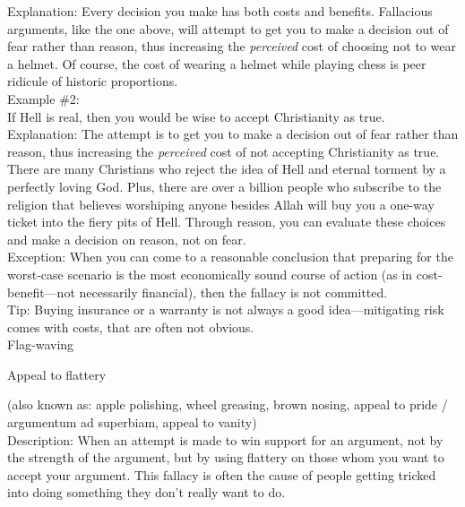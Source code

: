 \documentclass[a4paper,12pt,single,pdftex]{scrartcl}
\begin{document}
    
      Explanation: Every decision you make has both costs and benefits.  Fallacious arguments, like the one above, will attempt to get you to make a decision out of fear rather than reason, thus increasing the {\it perceived}  cost of choosing not to wear a helmet.  Of course, the cost of wearing a helmet while playing chess is peer ridicule of historic proportions.
    \\

    
      Example \#2:
    \\

    
      If Hell is real, then you would be wise to accept Christianity as true.
    \\

    
      Explanation: The attempt is to get you to make a decision out of fear rather than reason, thus increasing the {\it perceived} cost of not accepting Christianity as true.  There are many Christians who reject the idea of Hell and eternal torment by a perfectly loving God.  Plus, there are over a billion people who subscribe to the religion that believes worshiping anyone besides Allah will buy you a one-way ticket into the fiery pits of Hell.  Through reason, you can evaluate these choices and make a decision on reason, not on fear.
    \\

    
      Exception: When you can come to a reasonable conclusion that preparing for the worst-case scenario is the most economically sound course of action (as in cost-benefit—not necessarily financial), then the fallacy is not committed.
    \\

    
      Tip: Buying insurance or a warranty is not always a good idea—mitigating risk comes with costs, that are often not obvious.
    \\

  

Flag-waving

Appeal to flattery
    
      (also known as: apple polishing, wheel greasing, brown nosing, appeal to pride / argumentum ad superbiam, appeal to vanity)
    \\

  
    Description: When an attempt is made to win support for an argument, not by the strength of the argument, but by using flattery on those whom you want to accept your argument.  This fallacy is often the cause of people getting tricked into doing something they don’t really want to do.
\end{document}
